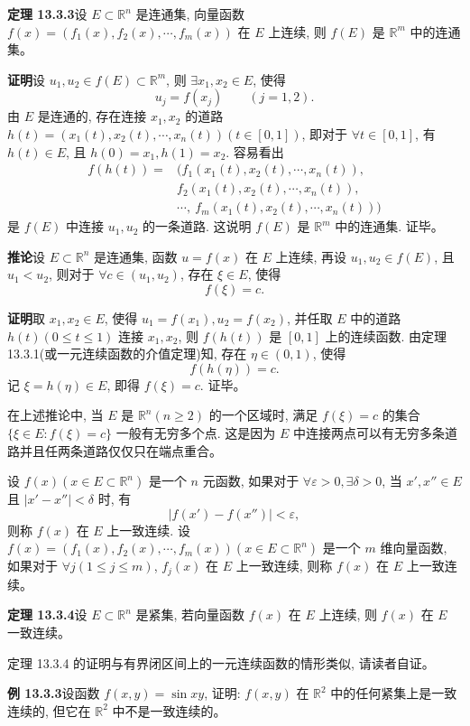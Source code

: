 \documentclass[UTF8,12pt,a4paper,fontset=fandol]{ctexart}
\begin{document}
\noindent\textbf{定理 13.3.3}\quad 设 $E\subset\mathbb R^n$ 是连通集, 向量函数 $f(x)=(f_1(x),f_2(x),\cdots,f_m(x))$ 在 $E$ 上连续, 则 $f(E)$ 是 $\mathbb R^m$ 中的连通集。

\noindent\textbf{证明}\quad 设 $u_1,u_2\in f(E)\subset\mathbb R^m$, 则 $\exists x_1,x_2\in E$, 使得
\[
  u_j=f(x_j)\qquad (j=1,2).
\]
由 $E$ 是连通的, 存在连接 $x_1,x_2$ 的道路 $h(t)=(x_1(t),x_2(t),\cdots,x_n(t))(t\in[0,1])$, 即对于 $\forall t\in[0,1]$, 有 $h(t)\in E$, 且 $h(0)=x_1,h(1)=x_2$. 容易看出
\[
\begin{aligned}
  f(h(t))={}&(f_1(x_1(t),x_2(t),\cdots,x_n(t)),\\
  &f_2(x_1(t),x_2(t),\cdots,x_n(t)),\\
  &\cdots,\ f_m(x_1(t),x_2(t),\cdots,x_n(t)))
\end{aligned}
\]
是 $f(E)$ 中连接 $u_1,u_2$ 的一条道路. 这说明 $f(E)$ 是 $\mathbb R^m$ 中的连通集. 证毕。

\noindent\textbf{推论}\quad 设 $E\subset\mathbb R^n$ 是连通集, 函数 $u=f(x)$ 在 $E$ 上连续, 再设 $u_1,u_2\in f(E)$, 且 $u_1<u_2$, 则对于 $\forall c\in(u_1,u_2)$, 存在 $\xi\in E$, 使得
\[
  f(\xi)=c.
\]

\noindent\textbf{证明}\quad 取 $x_1,x_2\in E$, 使得 $u_1=f(x_1),u_2=f(x_2)$, 并任取 $E$ 中的道路 $h(t)(0\leqslant t\leqslant1)$ 连接 $x_1,x_2$, 则 $f(h(t))$ 是 $[0,1]$ 上的连续函数. 由定理 13.3.1(或一元连续函数的介值定理)知, 存在 $\eta\in(0,1)$, 使得
\[
  f(h(\eta))=c.
\]
记 $\xi=h(\eta)\in E$, 即得 $f(\xi)=c$. 证毕。

在上述推论中, 当 $E$ 是 $\mathbb R^n(n\geqslant2)$ 的一个区域时, 满足 $f(\xi)=c$ 的集合 $\{\xi\in E:f(\xi)=c\}$ 一般有无穷多个点. 这是因为 $E$ 中连接两点可以有无穷多条道路并且任两条道路仅仅只在端点重合。

设 $f(x)(x\in E\subset\mathbb R^n)$ 是一个 $n$ 元函数, 如果对于 $\forall\varepsilon>0,\exists\delta>0$, 当 $x',x''\in E$ 且 $|x'-x''|<\delta$ 时, 有
\[
  |f(x')-f(x'')|<\varepsilon,
\]
则称 $f(x)$ 在 $E$ 上一致连续. 设 $f(x)=(f_1(x),f_2(x),\cdots,f_m(x))(x\in E\subset\mathbb R^n)$ 是一个 $m$ 维向量函数, 如果对于 $\forall j(1\leqslant j\leqslant m)$, $f_j(x)$ 在 $E$ 上一致连续, 则称 $f(x)$ 在 $E$ 上一致连续。

\noindent\textbf{定理 13.3.4}\quad 设 $E\subset\mathbb R^n$ 是紧集, 若向量函数 $f(x)$ 在 $E$ 上连续, 则 $f(x)$ 在 $E$ 一致连续。

定理 13.3.4 的证明与有界闭区间上的一元连续函数的情形类似, 请读者自证。

\noindent\textbf{例 13.3.3}\quad 设函数 $f(x,y)=\sin xy$, 证明: $f(x,y)$ 在 $\mathbb R^2$ 中的任何紧集上是一致连续的, 但它在 $\mathbb R^2$ 中不是一致连续的。
\end{document}
